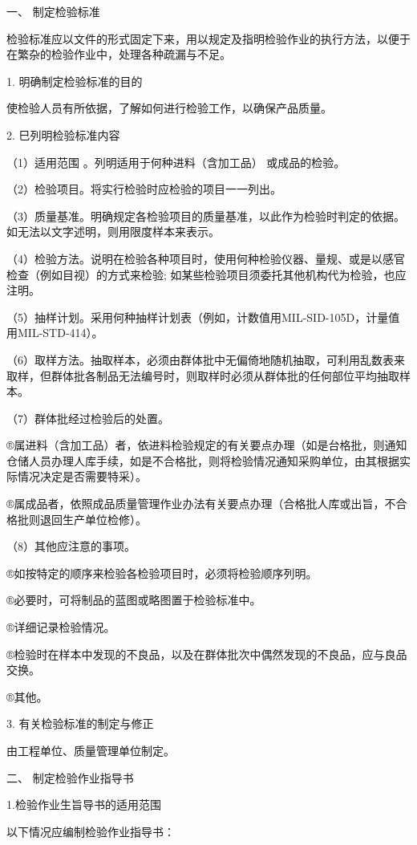 
一、 制定检验标准

    检验标准应以文件的形式固定下来，用以规定及指明检验作业的执行方法，以便于在繁杂的检验作业中，处理各种疏漏与不足。

    1. 明确制定检验标准的目的

    使检验人员有所依据，了解如何进行检验工作，以确保产品质量。

    2. 巳列明检验标准内容

    （1）适用范围 。列明适用于何种进料（含加工品） 或成品的检验。

    （2）检验项目。将实行检验时应检验的项目一一列出。

    （3）质量基准。明确规定各检验项目的质量基准，以此作为检验时判定的依据。如无法以文字述明，则用限度样本来表示。

    （4）检验方法。说明在检验各种项目时，使用何种检验仪器、量规、或是以感官检查（例如目视）的方式来检验; 如某些检验项目须委托其他机构代为检验，也应注明。

    （5）抽样计划。采用何种抽样计划表（例如，计数值用MIL-SID-105D，计量值用MIL-STD-414）。

    （6）取样方法。抽取样本，必须由群体批中无偏倚地随机抽取，可利用乱数表来取样，但群体批各制品无法编号时，则取样时必须从群体批的任何部位平均抽取样本。

    （7）群体批经过检验后的处置。

    ®属进料（含加工品）者，依进料检验规定的有关要点办理（如是台格批，则通知仓储人员办理人库手续，如是不合格批，则将检验情况通知采购单位，由其根据实际情况决定是否需要特采）。

    ®属成品者，依照成品质量管理作业办法有关要点办理（合格批人库或出旨，不合格批则退回生产单位检修）。

    （8）其他应注意的事项。

    ®如按特定的顺序来检验各检验项目时，必须将检验顺序列明。

    ®必要时，可将制品的蓝图或略图置于检验标准中。

    ®详细记录检验情况。

    ®检验时在样本中发现的不良品，以及在群体批次中偶然发现的不良品，应与良品交换。

    ®其他。

    3. 有关检验标准的制定与修正

    由工程单位、质量管理单位制定。

二、 制定检验作业指导书

    1.检验作业生旨导书的适用范围

    以下情况应编制检验作业指导书：


